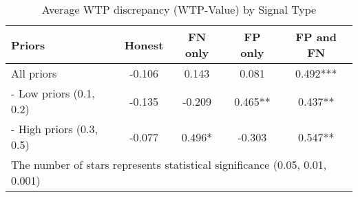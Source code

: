\begin{table}[H]\centering \caption{Average WTP discrepancy (WTP-Value) by Signal Type} \label{tab:WTP_nonpar}
\begin{tabular}{lcccc} 
\hline \hline
\textbf{Priors}&\textbf{Honest}&\textbf{FN only}& \textbf{FP only} & \textbf{FP and FN}\\ \hline
All priors&-0.106&0.143&0.081&0.492***\\
\hspace{3pt}- Low priors (0.1, 0.2)&-0.135&-0.209&0.465**&0.437**\\
\hspace{3pt}- High priors (0.3, 0.5)&-0.077&0.496*&-0.303&0.547**\\
\hline \multicolumn{5}{l}{\footnotesize *The number of stars represents statistical significance (0.05, 0.01, 0.001)} \\ \end{tabular} \end{table}
